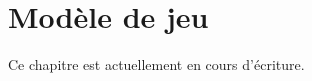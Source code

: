\chapter{Modèle de jeu}

\begin{info}
	Ce chapitre est actuellement en cours d'écriture.
\end{info}

	
% 
%	
%	
%		
%	
%	
%	
%		
%		
